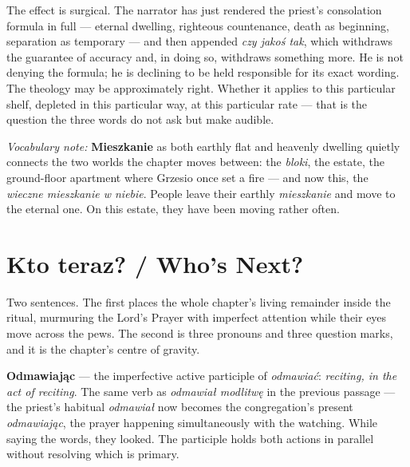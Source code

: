 The effect is surgical. The narrator has just rendered
the priest's consolation formula in full --- eternal
dwelling, righteous countenance, death as beginning,
separation as temporary --- and then appended \textit{czy
jakoś tak}, which withdraws the guarantee of accuracy
and, in doing so, withdraws something more. He is not
denying the formula; he is declining to be held
responsible for its exact wording. The theology may be
approximately right. Whether it applies to this
particular shelf, depleted in this particular way, at
this particular rate --- that is the question the three
words do not ask but make audible.

\medskip
\noindent\textit{Vocabulary note:} \textbf{Mieszkanie}
as both earthly flat and heavenly dwelling quietly
connects the two worlds the chapter moves between: the
\textit{bloki}, the estate, the ground-floor apartment
where Grzesio once set a fire --- and now this, the
\textit{wieczne mieszkanie w niebie}. People leave their
earthly \textit{mieszkanie} and move to the eternal one.
On this estate, they have been moving rather often.

\section{Kto teraz? / Who's Next?}



Two sentences. The first places the whole chapter's
living remainder inside the ritual, murmuring the Lord's
Prayer with imperfect attention while their eyes move
across the pews. The second is three pronouns and three
question marks, and it is the chapter's centre of gravity.

\textbf{Odmawiając} --- the imperfective active participle
of \textit{odmawiać}: \textit{reciting, in the act of
reciting}. The same verb as \textit{odmawiał modlitwę}
in the previous passage --- the priest's habitual
\textit{odmawiał} now becomes the congregation's present
\textit{odmawiając}, the prayer happening simultaneously
with the watching. While saying the words, they looked.
The participle holds both actions in parallel without
resolving which is primary.

